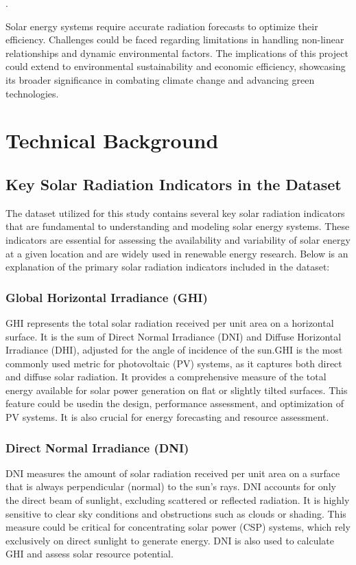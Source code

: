 \documentclass[10pt,twocolumn]{article}
\begin{document}
.

Solar energy systems require accurate radiation forecasts to optimize their efficiency. Challenges could be faced regarding limitations in handling non-linear relationships and dynamic environmental factors. The implications of this project could extend to environmental sustainability and economic efficiency, showcasing its broader significance in combating climate change and advancing green technologies.

\section{Technical Background}

\subsection{Key Solar Radiation Indicators in the Dataset}

The dataset utilized for this study contains several key solar radiation indicators that are fundamental to understanding and modeling solar energy systems. These indicators are essential for assessing the availability and variability of solar energy at a given location and are widely used in renewable energy research. Below is an explanation of the primary solar radiation indicators included in the dataset:

\subsubsection{Global Horizontal Irradiance (GHI)}
\begin{itemize}
     GHI represents the total solar radiation received per unit area on a horizontal surface. It is the sum of Direct Normal Irradiance (DNI) and Diffuse Horizontal Irradiance (DHI), adjusted for the angle of incidence of the sun.GHI is the most commonly used metric for photovoltaic (PV) systems, as it captures both direct and diffuse solar radiation. It provides a comprehensive measure of the total energy available for solar power generation on flat or slightly tilted surfaces. This feature could be usedin the design, performance assessment, and optimization of PV systems. It is also crucial for energy forecasting and resource assessment.
\end{itemize}

\subsubsection{Direct Normal Irradiance (DNI)}
\begin{itemize}
     DNI measures the amount of solar radiation received per unit area on a surface that is always perpendicular (normal) to the sun's rays. DNI accounts for only the direct beam of sunlight, excluding scattered or reflected radiation. It is highly sensitive to clear sky conditions and obstructions such as clouds or shading. This measure could be critical for concentrating solar power (CSP) systems, which rely exclusively on direct sunlight to generate energy. DNI is also used to calculate GHI and assess solar resource potential.
\end{itemize}
\end{document}
